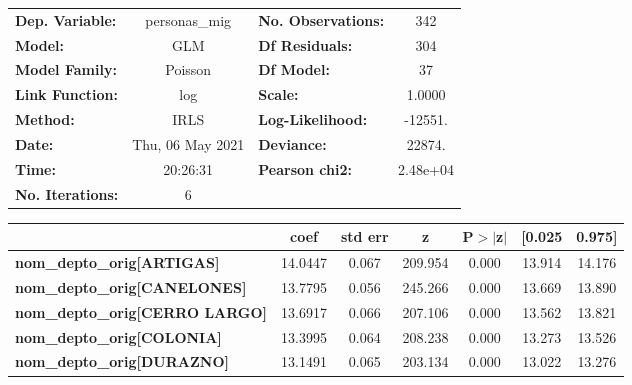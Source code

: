 \begin{center}
\begin{tabular}{lclc}
\toprule
\textbf{Dep. Variable:}                    &  personas\_mig   & \textbf{  No. Observations:  } &      342    \\
\textbf{Model:}                            &       GLM        & \textbf{  Df Residuals:      } &      304    \\
\textbf{Model Family:}                     &     Poisson      & \textbf{  Df Model:          } &       37    \\
\textbf{Link Function:}                    &       log        & \textbf{  Scale:             } &    1.0000   \\
\textbf{Method:}                           &       IRLS       & \textbf{  Log-Likelihood:    } &   -12551.   \\
\textbf{Date:}                             & Thu, 06 May 2021 & \textbf{  Deviance:          } &    22874.   \\
\textbf{Time:}                             &     20:26:31     & \textbf{  Pearson chi2:      } &  2.48e+04   \\
\textbf{No. Iterations:}                   &        6         & \textbf{                     } &             \\
\bottomrule
\end{tabular}
\begin{tabular}{lcccccc}
                                           & \textbf{coef} & \textbf{std err} & \textbf{z} & \textbf{P$> |$z$|$} & \textbf{[0.025} & \textbf{0.975]}  \\
\midrule
\textbf{nom\_depto\_orig[ARTIGAS]}         &      14.0447  &        0.067     &   209.954  &         0.000        &       13.914    &       14.176     \\
\textbf{nom\_depto\_orig[CANELONES]}       &      13.7795  &        0.056     &   245.266  &         0.000        &       13.669    &       13.890     \\
\textbf{nom\_depto\_orig[CERRO LARGO]}     &      13.6917  &        0.066     &   207.106  &         0.000        &       13.562    &       13.821     \\
\textbf{nom\_depto\_orig[COLONIA]}         &      13.3995  &        0.064     &   208.238  &         0.000        &       13.273    &       13.526     \\
\textbf{nom\_depto\_orig[DURAZNO]}         &      13.1491  &        0.065     &   203.134  &         0.000        &       13.022    &       13.276     \\

\end{tabular}
\end{center}
